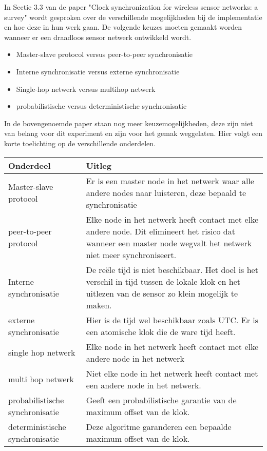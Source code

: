 \documentclass{article}
\begin{document}
In Sectie 3.3 van de paper "Clock synchronization for wireless sensor networks: a survey" wordt gesproken over de verschillende mogelijkheden bij de implementatie en hoe deze in hun werk gaan. 
De volgende keuzes moeten gemaakt worden wanneer er een draadloos sensor netwerk ontwikkeld wordt. 
\begin{itemize}
	\item Master-slave protocol versus peer-to-peer synchronisatie
	\item Interne synchronisatie versus externe synchronisatie
	\item Single-hop netwerk versus multihop netwerk
	\item probabilistische versus deterministische synchronisatie
\end{itemize}
In de bovengenoemde paper staan nog meer keuzemogelijkheden, deze zijn niet van belang voor dit experiment en zijn voor het gemak weggelaten.
Hier volgt een korte toelichting op de verschillende onderdelen.
\begin{center}
    \begin{tabular}{  l | p{5cm} }
    
    \textbf{Onderdeel} & \textbf{Uitleg} \\ \hline\hline
    Master-slave protocol & Er is een master node in het netwerk waar alle andere nodes naar luisteren, deze bepaald te synchronisatie \\ \hline
    peer-to-peer protocol &  Elke node in het netwerk heeft contact met elke andere node. Dit elimineert het risico dat wanneer een master node wegvalt het netwerk niet meer synchroniseert.\\ \hline
    Interne synchronisatie & De re\"{e}le tijd is niet beschikbaar. Het doel is het verschil in tijd tussen de lokale klok en het uitlezen van de sensor zo klein mogelijk te maken.\\
    \hline
    externe synchronisatie & Hier is de tijd wel beschikbaar zoals UTC. Er is een atomische klok die de ware tijd heeft.\\
    \hline
    single hop netwerk & Elke node in het netwerk heeft contact met elke andere node in het netwerk\\
    \hline
    multi hop netwerk & Niet elke node in het netwerk heeft contact met een andere node in het netwerk. \\
    \hline
    probabilistische synchronisatie & Geeft een probabilistische garantie van de maximum offset van de klok. \\
    \hline
    deterministische synchronisatie & Deze algoritme garanderen een bepaalde maximum offset van de klok. \\
    
    \end{tabular}
\end{center}
\end{document}
